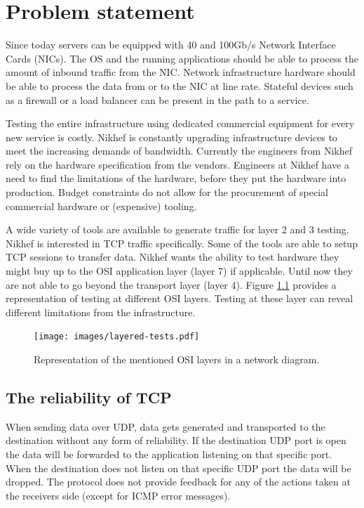 \chapter{Problem statement}\label{ch:problem}

Since today servers can be equipped with 40 and 100Gb/s Network Interface Cards (NICs). 
The OS and the running applications should be able to process the amount of inbound traffic from the NIC.
Network infrastructure hardware should be able to process the data from or to the NIC at line rate.
Stateful devices such as a firewall or a load balancer can be present in the path to a service. 

Testing the entire infrastructure using dedicated commercial equipment for every new service is costly.
Nikhef is constantly upgrading infrastructure devices to meet the increasing demands of bandwidth. 
Currently the engineers from Nikhef rely on the hardware specification from the vendors. 
Engineers at Nikhef have a need to find the limitations of the hardware, before they put the hardware into production. 
Budget constraints do not allow for the procurement of special commercial hardware or (expensive) tooling. 

A wide variety of tools are available to generate traffic for layer 2 and 3 testing. Nikhef is interested in TCP traffic specifically.  
Some of the tools are able to setup TCP sessions to transfer data. 
Nikhef wants the ability to test hardware they might buy up to the OSI application layer (layer 7) if applicable. 
Until now they are not able to go beyond the transport layer (layer 4).
Figure \ref{fig:layeredtesting} provides a representation of testing at different OSI layers.
Testing at these layer can reveal different limitations from the infrastructure.

\begin{figure}[H]
  \texttt{[image: images/layered-tests.pdf]}
  \caption{Representation of the mentioned OSI layers in a network diagram.}
  \label{fig:layeredtesting}
\end{figure}

\section{The reliability of TCP}\label{sec:sessionbased}
When sending data over UDP, data gets generated and transported to the destination without any form of reliability. 
If the destination UDP port is open the data will be forwarded to the application listening on that specific port.
When the destination does not listen on that specific UDP port the data will be dropped.
The protocol does not provide feedback for any of the actions taken at the receivers side (except for ICMP error messages).
 
